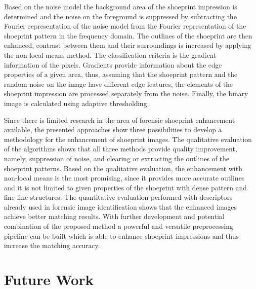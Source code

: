 \documentclass[draft,final]{vutinfth} %
\begin{document}
Based on the noise model the background area of the shoeprint impression is determined and the noise on the foreground is suppressed by subtracting the Fourier representation of the noise model from the Fourier representation of the shoeprint pattern in the frequency domain.
The outlines of the shoeprint are then enhanced, contrast between them and their surroundings is increased by applying the non-local means method.
The classification criteria is the gradient information of the pixels.
Gradients provide information about the edge properties of a given area, thus, assuming that the shoeprint pattern and the random noise on the image have different edge features, the elements of the shoeprint impression are processed separately from the noise.
Finally, the binary image is calculated using adaptive thresholding.
\par
Since there is limited research in the area of forensic shoeprint enhancement available, the presented approaches show three possibilities to develop a methodology for the enhancement of shoeprint images.
The qualitative evaluation of the algorithms shows that all three methods provide quality improvement, namely, suppression of noise, and clearing or extracting the outlines of the shoeprint patterns. 
Based on the qualitative evaluation, the enhancement with non-local means is the most promising, since it provides more accurate outlines and it is not limited to given properties of the shoeprint with dense pattern and fine-line structures.
The quantitative evaluation performed with descriptors already used in forensic image identification shows that the enhanced images achieve better matching results.
With further development and potential combination of the proposed method a powerful and versatile preprocessing pipeline can be built which is able to enhance shoeprint impressions and thus increase the matching accuracy.

\section*{Future Work}
\end{document}

